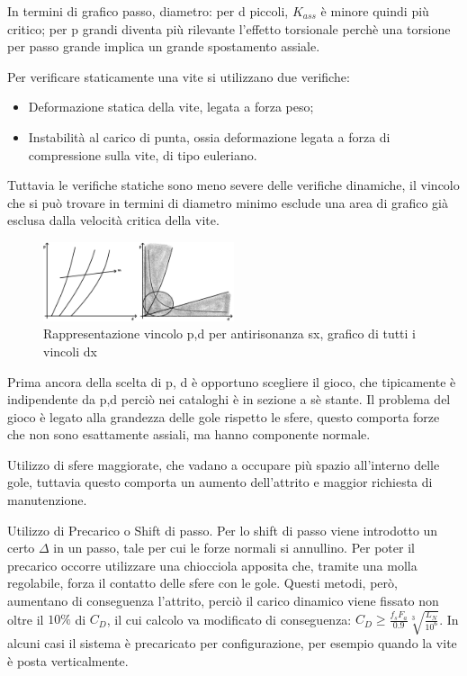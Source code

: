 In termini di grafico passo, diametro: per d piccoli, \( K_{ass} \) è minore quindi più critico; per p grandi diventa più rilevante l'effetto torsionale perchè una torsione per passo grande implica un grande spostamento assiale.

Per verificare staticamente una vite si utilizzano due verifiche:
\begin{itemize}
    \item Deformazione statica della vite, legata a forza peso;
    \item Instabilità al carico di punta, ossia deformazione legata a forza di compressione sulla vite, di tipo euleriano.
\end{itemize}
Tuttavia le verifiche statiche sono meno severe delle verifiche dinamiche, il vincolo che si può trovare in termini di diametro minimo esclude una area di grafico già esclusa dalla velocità critica della vite.

\begin{figure}[h]
    \centering
    \includegraphics[width=0.5\textwidth]{Immagini/vincolo_antirisonanza.png}
    \caption{Rappresentazione vincolo p,d per antirisonanza sx, grafico di tutti i vincoli dx}
\end{figure}

 \label{giocoViti}
Prima ancora della scelta di p, d è opportuno scegliere il gioco, che tipicamente è indipendente da p,d perciò nei cataloghi è in sezione a sè stante.
Il problema del gioco è legato alla grandezza delle gole rispetto le sfere, questo comporta forze che non sono esattamente assiali, ma hanno componente normale.

Utilizzo di sfere maggiorate, che vadano a occupare più spazio all'interno delle gole, tuttavia questo comporta un aumento dell'attrito e maggior richiesta di manutenzione.

Utilizzo di Precarico o Shift di passo.
Per lo shift di passo viene introdotto un certo \(\Delta\) in un passo, tale per cui le forze normali si annullino. 
Per poter il precarico occorre utilizzare una chiocciola apposita che, tramite una molla regolabile, forza il contatto delle sfere con le gole. Questi metodi, però, aumentano di conseguenza l'attrito, perciò il carico dinamico viene fissato non oltre il \(10\%\) di \(C_D\), il cui calcolo va modificato di conseguenza: \( C_D \geqslant \frac{f_s F_a}{0.9} \sqrt[3]{\frac{L_N}{10^6}} \).
In alcuni casi il sistema è precaricato per configurazione, per esempio quando la vite è posta verticalmente.

